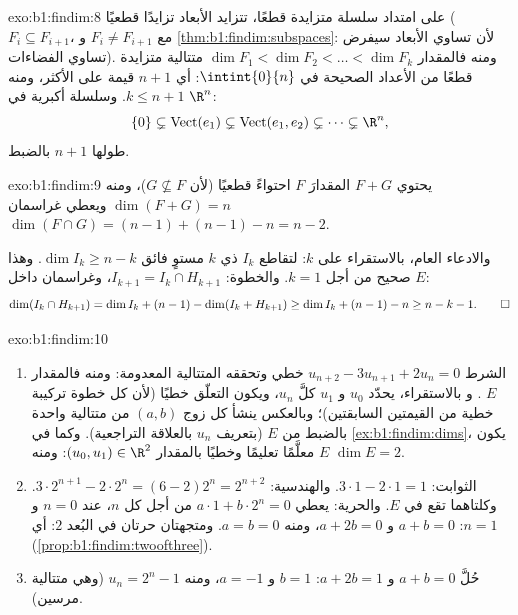 \begin{solution}{exo:b1:findim:8}
على امتداد سلسلة متزايدة قطعًا، تتزايد الأبعاد تزايدًا قطعيًا
($F_i \subseteq F_{i+1}$، مع $F_i \neq F_{i+1}$ و
\cref{thm:b1:findim:subspaces}: لأن تساوي الأبعاد سيفرض
تساوي الفضاءات). ومنه فالمقدار $\dim F_1 < \dim F_2 < \dots < \dim F_k$
متتالية متزايدة قطعًا من الأعداد الصحيحة في $\intint{0}{n}$: أي
$n + 1$ قيمة على الأكثر، ومنه $k \leq n + 1$. وسلسلة أكبرية في $\R^n$:
\[
\{0\} \subsetneq \operatorname{Vect}(e_1) \subsetneq
\operatorname{Vect}(e_1, e_2) \subsetneq \dots \subsetneq \R^n ,
\]
طولها $n + 1$ بالضبط.
\end{solution}

\begin{solution}{exo:b1:findim:9}
يحتوي $F + G$ المقدارَ $F$ احتواءً قطعيًا (لأن $G \not\subseteq F$)، ومنه
$\dim(F + G) = n$ ويعطي غراسمان $\dim(F \cap G) = (n-1) +
(n-1) - n = n - 2$.

والادعاء العام، بالاستقراء على $k$: لتقاطع $I_k$ ذي $k$
مستوٍ فائق $\dim I_k \geq n - k$. وهذا صحيح من أجل $k = 1$. والخطوة: $I_{k+1}
= I_k \cap H_{k+1}$، وغراسمان داخل $E$:
\[
\dim(I_k \cap H_{k+1}) = \dim I_k + (n - 1) - \dim(I_k + H_{k+1})
\geq \dim I_k + (n-1) - n \geq n - k - 1 . \qedhere
\]
\end{solution}

\begin{solution}{exo:b1:findim:10}
\begin{enumerate}
  \item الشرط $u_{n+2} - 3u_{n+1} + 2u_n = 0$ خطي
        وتحققه المتتالية المعدومة: ومنه فالمقدار $E$ . و
        بالاستقراء، يحدّد $u_0$ و $u_1$ كلَّ $u_n$، ويكون
        التعلّق خطيًا (لأن كل خطوة تركيبة خطية من
        القيمتين السابقتين)؛ وبالعكس ينشأ كل زوج $(a, b)$
        من متتالية واحدة بالضبط من $E$ (بتعريف $u_n$ بالعلاقة
        التراجعية). وكما في \cref{ex:b1:findim:dims}، يكون $E$
        معلَّمًا تعليمًا  وخطيًا بالمقدار $(u_0, u_1) \in
        \R^2$: ومنه $\dim E = 2$.
  \item الثوابت: $3\cdot1 - 2\cdot1 = 1$. والهندسية: $3\cdot
        2^{n+1} - 2\cdot 2^n = (6 - 2)2^n = 2^{n+2}$. وكلتاهما تقع في
        $E$. والحرية: يعطي $a\cdot 1 + b\cdot 2^n = 0$ من أجل كل $n$،
        عند $n = 0$ و $n = 1$: $a + b = 0$ و $a + 2b = 0$،
        ومنه $a = b = 0$. ومتجهتان حرتان في البُعد $2$: أي 
        (\cref{prop:b1:findim:twoofthree}).
  \item حُلَّ $a + b = 0$ و $a + 2b = 1$: $b = 1$ و $a = -1$، ومنه
        $u_n = 2^n - 1$ (وهي متتالية مرسين).
\end{enumerate}
\end{solution}

